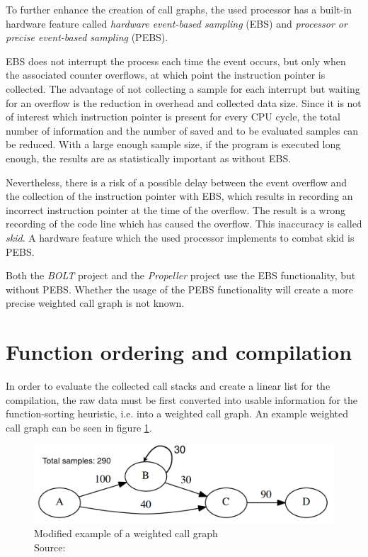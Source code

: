 To further enhance the creation of call graphs, the used processor has a built-in  hardware feature called \textit{hardware event-based sampling} (EBS) and \textit{processor or precise event-based sampling} (PEBS). \cite[p. 158]{brendan}

EBS does not interrupt the process each time the event occurs, but only when the associated counter overflows, at which point the instruction pointer is collected. \cite[p. 59-60]{patmc} \cite{brendan-perf} The advantage of not collecting a sample for each interrupt but waiting for an overflow is the reduction in overhead and collected data size. Since it is not of interest which instruction pointer is present for every CPU cycle, the total number of information and the number of saved and to be evaluated samples can be reduced. With a large enough sample size, if the program is executed long enough, the results are as statistically important as without EBS. \cite[p. 59-60]{patmc} \cite{brendan-perf} \cite{intel_ebs}

Nevertheless, there is a risk of a possible delay between the event overflow and the collection of the instruction pointer with EBS, which results in recording an incorrect instruction pointer at the time of the overflow. The result is a wrong recording of the code line which has caused the overflow. This inaccuracy is called \textit{skid}. A hardware feature which the used processor implements to combat skid is PEBS. \cite[p. 158]{brendan} \cite{intel_skid}
\enlargethispage{\baselineskip}

Both the \textit{BOLT} project \cite{llvm-bolt} and the \textit{Propeller} project \cite{llvm-propeller} use the EBS functionality, but without PEBS. Whether the usage of the PEBS functionality will create a more precise weighted call graph is not known.

\section{Function ordering and compilation}

In order to evaluate the collected call stacks and create a linear list for the compilation, the raw data must be first converted into usable information for the function-sorting heuristic, i.e. into a weighted call graph. An example weighted call graph can be seen in figure \ref{fig:excallgraph}.

\begin{figure}[H]
    \centering
    \includegraphics[width=.7\textwidth]{images/5_implementation/c3-custom-example.png}
    \caption{Modified example of a weighted call graph\\Source: \cite{hfsort}}
    \label{fig:excallgraph}
    \vspace{-\baselineskip}
\end{figure}

